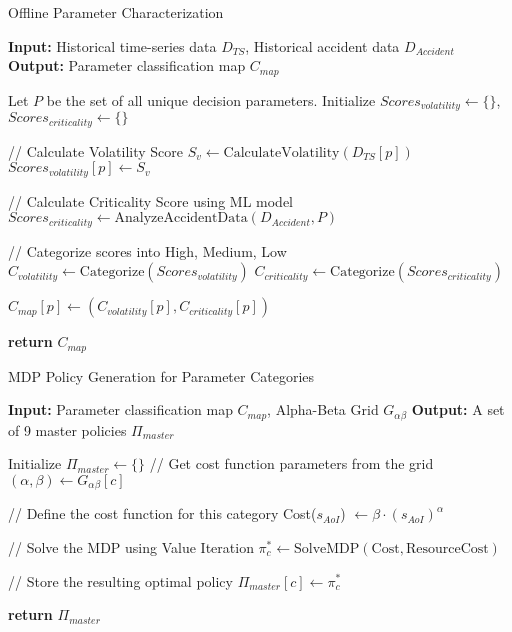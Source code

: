 \documentclass[journal]{IEEEtran}
\begin{document}
\begin{algorithm}[H]
\caption{Offline Parameter Characterization}
\label{alg:offline_characterization}
\begin{algorithmic}[1]
\STATE \textbf{Input:} Historical time-series data $D_{TS}$, Historical accident data $D_{Accident}$
\STATE \textbf{Output:} Parameter classification map $C_{map}$

\STATE Let $P$ be the set of all unique decision parameters.
\STATE Initialize $Scores_{volatility} \leftarrow \{\}$, $Scores_{criticality} \leftarrow \{\}$

    \STATE // Calculate Volatility Score
    \STATE $S_v \leftarrow \text{CalculateVolatility}(D_{TS}[p])$ 
    \STATE $Scores_{volatility}[p] \leftarrow S_v$
\ENDFOR

\STATE // Calculate Criticality Score using ML model
\STATE $Scores_{criticality} \leftarrow \text{AnalyzeAccidentData}(D_{Accident}, P)$ 

\STATE // Categorize scores into High, Medium, Low
\STATE $C_{volatility} \leftarrow \text{Categorize}(Scores_{volatility})$
\STATE $C_{criticality} \leftarrow \text{Categorize}(Scores_{criticality})$

    \STATE $C_{map}[p] \leftarrow (C_{volatility}[p], C_{criticality}[p])$
\ENDFOR

\STATE \textbf{return} $C_{map}$
\end{algorithmic}
\end{algorithm}

\begin{algorithm}[H]
\caption{MDP Policy Generation for Parameter Categories}
\label{alg:mdp_generation}
\begin{algorithmic}[1]
\STATE \textbf{Input:} Parameter classification map $C_{map}$, Alpha-Beta Grid $G_{\alpha\beta}$
\STATE \textbf{Output:} A set of 9 master policies $\Pi_{master}$

\STATE Initialize $\Pi_{master} \leftarrow \{\}$
    \STATE // Get cost function parameters from the grid
    \STATE $(\alpha, \beta) \leftarrow G_{\alpha\beta}[c]$
    
    \STATE // Define the cost function for this category
    \STATE Cost($s_{AoI}$) $\leftarrow \beta \cdot (s_{AoI})^\alpha$
    
    \STATE // Solve the MDP using Value Iteration
    \STATE $\pi^*_c \leftarrow \text{SolveMDP}(\text{Cost}, \text{ResourceCost})$
    
    \STATE // Store the resulting optimal policy
    \STATE $\Pi_{master}[c] \leftarrow \pi^*_c$
\ENDFOR

\STATE \textbf{return} $\Pi_{master}$
\end{algorithmic}
\end{algorithm}
\end{document}
